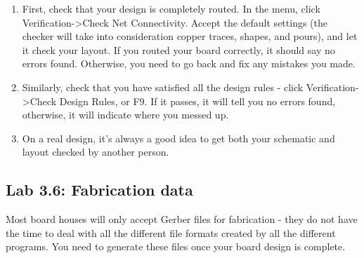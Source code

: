 \documentclass[letterpaper]{article}
\newcounter{saveenum}
\newcommand\liststyleRTFNumvi{%
\renewcommand\theenumi{\arabic{enumi}}
\renewcommand\theenumii{\alph{enumii}}
\renewcommand\theenumiii{\roman{enumiii}}
\renewcommand\theenumiv{\arabic{enumiv}}
\renewcommand\labelenumi{\theenumi.}
\renewcommand\labelenumii{\theenumii.}
\renewcommand\labelenumiii{\theenumiii.}
\renewcommand\labelenumiv{\theenumiv.}
}
\begin{document}
\liststyleRTFNumvi
\setcounter{saveenum}{\value{enumi}}
\begin{enumerate}
\setcounter{enumi}{\value{saveenum}}
\item {\sffamily\color[rgb]{0.30980393,0.5058824,0.7411765}
First, check that your design is completely routed. In the menu, click Verification-{\textgreater}Check Net
Connectivity. Accept the default settings (the checker will take into consideration copper traces, shapes, and pours),
and let it check your layout. If you routed your board correctly, it should say {\textquotedbl}no errors
found.{\textquotedbl} Otherwise, you need to go back and fix any mistakes you made.}
\item {\sffamily\color[rgb]{0.30980393,0.5058824,0.7411765}
Similarly, check that you have satisfied all the design rules - click Verification-{\textgreater}Check Design Rules, or
F9. If it passes, it will tell you {\textquotedbl}no errors found,{\textquotedbl} otherwise, it will indicate where you
messed up.}
\item {\sffamily\color[rgb]{0.30980393,0.5058824,0.7411765}
On a real design, it's always a good idea to get both your schematic and layout checked by another person.}
\end{enumerate}

\bigskip

\subsection{Lab 3.6: Fabrication data}
\hypertarget{Toc337742701}{}{\sffamily\color[rgb]{0.30980393,0.5058824,0.7411765}
Most board houses will only accept Gerber files for fabrication - they do not have the time to deal with all the
different file formats created by all the different programs. You need to generate these files once your board design
is complete.}


\bigskip
\end{document}
